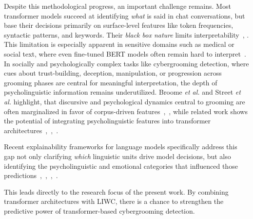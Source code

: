 Despite this methodological progress, an important challenge remains. Most transformer models succeed at identifying \emph{what} is said in chat conversations, but base their decisions primarily on surface-level features like token frequencies, syntactic patterns, and keywords. Their \textit{black box nature} limits interpretability~\cite{mersha2025explainabilityneuralnetworksnatural}, \cite{lokesh2025xai}. This limitation is especially apparent in sensitive domains such as medical or social text, where even fine-tuned BERT models often remain hard to interpret~\cite{talebi2024exploring}. In socially and psychologically  complex tasks like cybergrooming detection, where cues about trust-building, deception, manipulation, or progression across grooming phases are central for meaningful interpretation, the depth of psycholinguistic information remains underutilized. Broome \textit{et al.} and Street \textit{et al.} highlight, that discursive and psychological dynamics central to grooming are often marginalized in favor of corpus-driven features~\cite{broome2020psycholinguistic},~\cite{street2024grooming}, while related work shows the potential of integrating psycholinguistic features into transformer architectures~\cite{maharjan2025llmliwc},~\cite{zwanwar2022emotion},~\cite{kerz2022transformers}.

Recent explainability frameworks for language models specifically address this gap not only clarifying \emph{which} linguistic units drive model decisions, but also identifying the psycholinguistic and emotional categories that influenced those predictions~\cite{maharjan2025llmliwc},~\cite{zwanwar2022emotion},~\cite{lokesh2025xai},~\cite{ribeiro2024methodologyexplainablelargelanguage}.

This leads directly to the research focus of the present work. By combining transformer architectures with LIWC, there is a chance to strengthen the predictive power of transformer-based cybergrooming detection.


